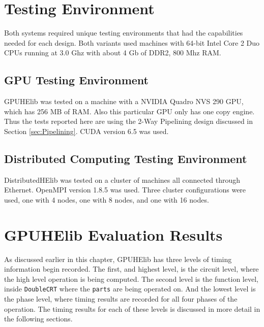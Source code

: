 \section{Testing Environment} \label{sec:TestingEnvironment}
Both systems required unique testing environments that had the capabilities needed for each design. Both variants used machines with 64-bit Intel Core 2 Duo CPUs running at 3.0 Ghz with about 4 Gb of DDR2, 800 Mhz RAM.

\subsection{GPU Testing Environment}
GPUHElib was tested on a machine with a NVIDIA Quadro NVS 290 GPU, which has 256 MB of RAM. Also this particular GPU only has one copy engine. Thus the tests reported here are using the 2-Way Pipelining design discussed in Section \ref{sec:Pipelining}. CUDA version 6.5 was used.

\subsection{Distributed Computing Testing Environment}
DistributedHElib was tested on a cluster of machines all connected through Ethernet. OpenMPI version 1.8.5 was used. Three cluster configurations were used, one with 4 nodes, one with 8 nodes, and one with 16 nodes.

\section{GPUHElib Evaluation Results} \label{sec:GPUHElibEvaluationResults}
As discussed earlier in this chapter, GPUHElib has three levels of timing information begin recorded. The first, and highest level, is the circuit level, where the high level operation is being computed. The second level is the function level, inside \verb|DoubleCRT| where the \verb|parts| are being operated on. And the lowest level is the phase level, where timing results are recorded for all four phases of the operation. The timing results for each of these levels is discussed in more detail in the following sections.

